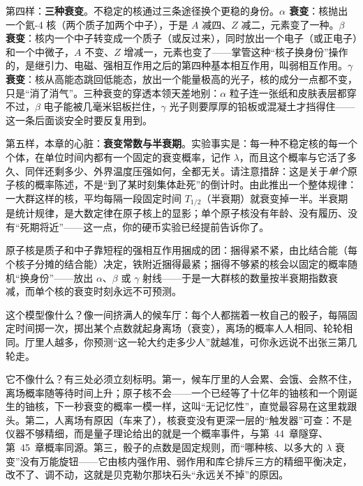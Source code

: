 第四样：\textbf{三种衰变}。不稳定的核通过三条途径换个更稳的身份。\textbf{\(\alpha\) 衰变}：核抛出一个氦-4 核（两个质子加两个中子），于是 \(A\) 减四、\(Z\) 减二，元素变了一种。\textbf{\(\beta\) 衰变}：核内一个中子转变成一个质子（或反过来），同时放出一个电子（或正电子）和一个中微子，\(A\) 不变、\(Z\) 增减一，元素也变了——掌管这种“核子换身份”操作的，是继引力、电磁、强相互作用之后的第四种基本相互作用，叫弱相互作用。\textbf{\(\gamma\) 衰变}：核从高能态跳回低能态，放出一个能量极高的光子，核的成分一点都不变，只是“消了消气”。三种衰变的穿透本领天差地别：\(\alpha\) 粒子连一张纸和皮肤表层都穿不过，\(\beta\) 电子能被几毫米铝板拦住，\(\gamma\) 光子则要厚厚的铅板或混凝土才挡得住——这一条后面谈安全时要反复用到。

第五样，本章的心脏：\textbf{衰变常数与半衰期}。实验事实是：每一种不稳定核的每一个个体，在单位时间内都有一个固定的衰变概率，记作 \(\lambda\)，而且这个概率与它活了多久、同伴还剩多少、外界温度压强如何，全都无关。请注意措辞：这是关于\emph{单个}原子核的概率陈述，不是“到了某时刻集体赴死”的倒计时。由此推出一个整体规律：一大群这样的核，平均每隔一段固定时间 \(T_{1/2}\)（半衰期）就衰变掉一半。半衰期是统计规律，是大数定律在原子核上的显影；单个原子核没有年龄、没有履历、没有“死期将近”——这一点，你的硬币实验已经提前告诉你了。


\begin{oneline}
原子核是质子和中子靠短程的强相互作用捆成的团：捆得紧不紧，由比结合能（每个核子分摊的结合能）决定，铁附近捆得最紧；捆得不够紧的核会以固定的概率随机“换身份”——放出 \(\alpha\)、\(\beta\) 或 \(\gamma\) 射线——于是一大群核的数量按半衰期指数衰减，而单个核的衰变时刻永远不可预测。
\end{oneline}

这个模型像什么？像一间挤满人的候车厅：每个人都揣着一枚自己的骰子，每隔固定时间掷一次，掷出某个点数就起身离场（衰变），离场的概率人人相同、轮轮相同。厅里人越多，你预测“这一轮大约走多少人”就越准，可你永远说不出张三第几轮走。

它不像什么？有三处必须立刻标明。第一，候车厅里的人会累、会饿、会熬不住，离场概率随等待时间上升；原子核不会——一个已经等了十亿年的铀核和一个刚诞生的铀核，下一秒衰变的概率一模一样，这叫“无记忆性”，直觉最容易在这里栽跟头。第二，人离场有原因（车来了），核衰变没有更深一层的“触发器”可查：不是仪器不够精细，而是量子理论给出的就是一个概率事件，与第~44~章隧穿、第~45~章概率同源。第三，骰子的点数是固定规则，而“哪种核、以多大的 \(\lambda\) 衰变”没有万能旋钮——它由核内强作用、弱作用和库仑排斥三方的精细平衡决定，改不了、调不动，这就是贝克勒尔那块石头“永远关不掉”的原因。

